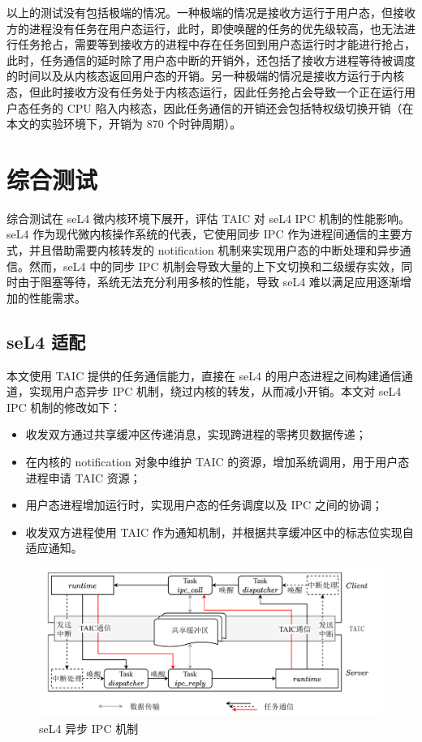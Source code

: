 以上的测试没有包括极端的情况。一种极端的情况是接收方运行于用户态，但接收方的进程没有任务在用户态运行，此时，即使唤醒的任务的优先级较高，也无法进行任务抢占，需要等到接收方的进程中存在任务回到用户态运行时才能进行抢占，此时，任务通信的延时除了用户态中断的开销外，还包括了接收方进程等待被调度的时间以及从内核态返回用户态的开销。另一种极端的情况是接收方运行于内核态，但此时接收方没有任务处于内核态运行，因此任务抢占会导致一个正在运行用户态任务的 CPU 陷入内核态，因此任务通信的开销还会包括特权级切换开销（在本文的实验环境下，开销为 870 个时钟周期）。

\section{综合测试}

综合测试在 seL4 微内核环境下展开，评估 TAIC 对 seL4 IPC 机制的性能影响。seL4 作为现代微内核操作系统的代表，它使用同步 IPC 作为进程间通信的主要方式，并且借助需要内核转发的 notification 机制来实现用户态的中断处理和异步通信。然而，seL4 中的同步 IPC 机制会导致大量的上下文切换和二级缓存实效，同时由于阻塞等待，系统无法充分利用多核的性能，导致 seL4 难以满足应用逐渐增加的性能需求。

\subsection{seL4 适配}

本文使用 TAIC 提供的任务通信能力，直接在 seL4 的用户态进程之间构建通信通道，实现用户态异步 IPC 机制，绕过内核的转发，从而减小开销。本文对 seL4 IPC 机制的修改如下：

\begin{itemize}
    \item 收发双方通过共享缓冲区传递消息，实现跨进程的零拷贝数据传递；
    \item 在内核的 notification 对象中维护 TAIC 的资源，增加系统调用，用于用户态进程申请 TAIC 资源；
    \item 用户态进程增加运行时，实现用户态的任务调度以及 IPC 之间的协调；
    \item 收发双方进程使用 TAIC 作为通知机制，并根据共享缓冲区中的标志位实现自适应通知。
\end{itemize}

\begin{figure}[htbp]
    \centering
    \includegraphics[width=\textwidth]{figures/pdfs/async_ipc.pdf}
    \caption[seL4 异步 IPC 机制]{seL4 异步 IPC 机制}
    \label{figure:seL4_async_ipc}
\end{figure}

